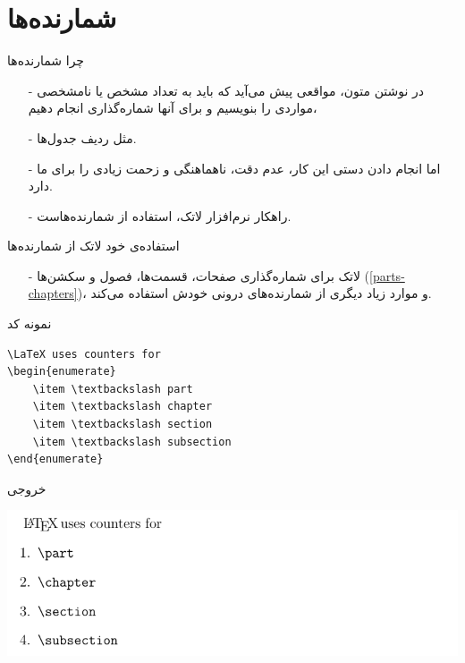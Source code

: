 \section{شمارنده‌ها}
\begin{frame}{چرا شمارنده‌ها}
\begin{itemize}\itemr
\item[-]
در نوشتن متون، مواقعی پیش می‌آید که باید به تعداد مشخص یا نامشخصی مواردی را بنویسیم و برای آنها شماره‌گذاری انجام دهیم،

\item[-]
مثل ردیف جدول‌ها.

\item[-]
اما انجام دادن دستی این کار، عدم دقت، ناهماهنگی و زحمت زیادی را برای ما دارد.

\item[-]
راهکار نرم‌افزار لاتک، استفاده از شمارنده‌هاست.
\end{itemize}
\end{frame}

\begin{frame}{استفاده‌ی خود لاتک از شمارنده‌ها}
\begin{itemize}\itemr
\item[-]
لاتک برای شماره‌گذاری صفحات، قسمت‌ها، فصول و سکشن‌ها
(\ref{parts-chapters})،
 و موارد زیاد دیگری از شمارنده‌های درونی خودش استفاده می‌کند.
\end{itemize}
\end{frame}

\begin{frame}[fragile]{نمونه کد}
\begin{latin}
\begin{lstlisting}[keywords={begin, end}, keywordstyle=\color{Mulberry}\textbf]
\LaTeX uses counters for
\begin{enumerate}
    \item \textbackslash part
    \item \textbackslash chapter
    \item \textbackslash section
    \item \textbackslash subsection
\end{enumerate}
\end{lstlisting}
\end{latin}
\end{frame}

\begin{frame}{خروجی}
\begin{center}
\includegraphics[width=\textwidth]{docs/images/enum-1}
\end{center}
\end{frame}

